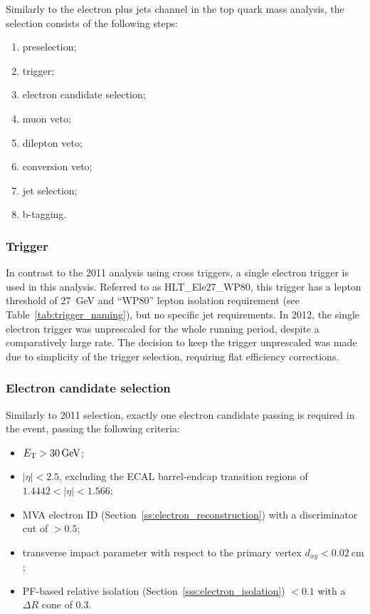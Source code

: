 Similarly to the electron plus jets channel in the top quark mass analysis, the selection consists of the following
steps:

\begin{enumerate}[topsep=\parskip, parsep=\parskip, itemsep=\parskip, leftmargin=\leftmargin]
	\item preselection;
	\item trigger;
	\item electron candidate selection;
	\item muon veto;
	\item dilepton veto;
	\item conversion veto;
	\item jet selection;
	\item b-tagging.
\end{enumerate}


\subsubsection*{Trigger}
In contrast to the 2011 analysis using cross triggers, a single electron trigger is used in this analysis. Referred to
as HLT\_Ele27\_WP80, this trigger has a lepton \pt threshold of \SI{27}{\GeV} and ``WP80'' lepton isolation requirement
(see Table~\ref{tab:trigger_naming}), but no specific jet requirements. In 2012, the single electron trigger was
unprescaled for the whole running period, despite a comparatively large rate. The decision to keep the trigger
unprescaled was made due to simplicity of the trigger selection, requiring flat efficiency corrections.

\subsubsection*{Electron candidate selection}
Similarly to 2011 selection, exactly one electron candidate passing is required in the event, passing the following
criteria:

\begin{itemize}
	\item $\ET > \SI{30}{\GeV}$;
	\item $|\eta| < 2.5$, excluding the ECAL barrel-endcap transition regions of $1.4442 < |\eta| < 1.566$;
	\item MVA electron ID (Section~\ref{ss:electron_reconstruction}) with a discriminator cut of $>0.5$;
	\item transverse impact parameter with respect to the primary vertex $d_{xy} < \SI{0.02}{\cm}$;
	\item PF-based relative isolation (Section~\ref{sss:electron_isolation}) \reliso $< 0.1$ with a $\Delta
R$ cone of \num{0.3}.
\end{itemize}

